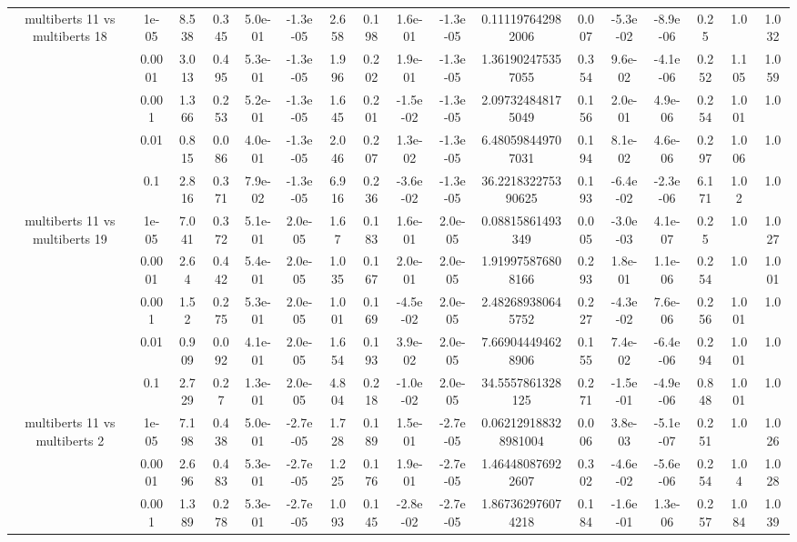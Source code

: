 \begin{tabular}{|c|c|c|c|c|c|c|c|c|c|c|c|c|c|c|c|c|}
\hline
\multirow{5}{*}{multiberts 11 vs multiberts 18} & 1e-05 & 8.538 & 0.345 & 5.0e-01 & -1.3e-05 & 2.658 & 0.198 & 1.6e-01 & -1.3e-05 & 0.111197642982006 & 0.007 & -5.3e-02 & -8.9e-06 & 0.25 & 1.0 & 1.032 \\
 & 0.0001 & 3.013 & 0.495 & 5.3e-01 & -1.3e-05 & 1.996 & 0.202 & 1.9e-01 & -1.3e-05 & 1.361902475357055 & 0.354 & 9.6e-02 & -4.1e-06 & 0.252 & 1.105 & 1.059 \\
 & 0.001 & 1.366 & 0.253 & 5.2e-01 & -1.3e-05 & 1.645 & 0.201 & -1.5e-02 & -1.3e-05 & 2.097324848175049 & 0.156 & 2.0e-01 & 4.9e-06 & 0.254 & 1.001 & 1.0 \\
 & 0.01 & 0.815 & 0.086 & 4.0e-01 & -1.3e-05 & 2.046 & 0.207 & 1.3e-02 & -1.3e-05 & 6.480598449707031 & 0.194 & 8.1e-02 & 4.6e-06 & 0.297 & 1.006 & 1.0 \\
 & 0.1 & 2.816 & 0.371 & 7.9e-02 & -1.3e-05 & 6.916 & 0.236 & -3.6e-02 & -1.3e-05 & 36.221832275390625 & 0.193 & -6.4e-02 & -2.3e-06 & 6.171 & 1.02 & 1.0 \\
\hline
\multirow{5}{*}{multiberts 11 vs multiberts 19} & 1e-05 & 7.041 & 0.372 & 5.1e-01 & 2.0e-05 & 1.67 & 0.183 & 1.6e-01 & 2.0e-05 & 0.08815861493349 & 0.005 & -3.0e-03 & 4.1e-07 & 0.25 & 1.0 & 1.027 \\
 & 0.0001 & 2.64 & 0.442 & 5.4e-01 & 2.0e-05 & 1.035 & 0.167 & 2.0e-01 & 2.0e-05 & 1.919975876808166 & 0.293 & 1.8e-01 & 1.1e-06 & 0.254 & 1.0 & 1.001 \\
 & 0.001 & 1.52 & 0.275 & 5.3e-01 & 2.0e-05 & 1.001 & 0.169 & -4.5e-02 & 2.0e-05 & 2.482689380645752 & 0.227 & -4.3e-02 & 7.6e-06 & 0.256 & 1.001 & 1.0 \\
 & 0.01 & 0.909 & 0.092 & 4.1e-01 & 2.0e-05 & 1.654 & 0.193 & 3.9e-02 & 2.0e-05 & 7.669044494628906 & 0.155 & 7.4e-02 & -6.4e-06 & 0.294 & 1.001 & 1.0 \\
 & 0.1 & 2.729 & 0.27 & 1.3e-01 & 2.0e-05 & 4.804 & 0.218 & -1.0e-02 & 2.0e-05 & 34.5557861328125 & 0.271 & -1.5e-01 & -4.9e-06 & 0.848 & 1.001 & 1.0 \\
\hline
\multirow{5}{*}{multiberts 11 vs multiberts 2} & 1e-05 & 7.198 & 0.438 & 5.0e-01 & -2.7e-05 & 1.728 & 0.189 & 1.5e-01 & -2.7e-05 & 0.062129188328981004 & 0.006 & 3.8e-03 & -5.1e-07 & 0.251 & 1.0 & 1.026 \\
 & 0.0001 & 2.696 & 0.483 & 5.3e-01 & -2.7e-05 & 1.225 & 0.176 & 1.9e-01 & -2.7e-05 & 1.464480876922607 & 0.302 & -4.6e-02 & -5.6e-06 & 0.254 & 1.04 & 1.028 \\
 & 0.001 & 1.389 & 0.278 & 5.3e-01 & -2.7e-05 & 1.093 & 0.145 & -2.8e-02 & -2.7e-05 & 1.867362976074218 & 0.184 & -1.6e-01 & 1.3e-06 & 0.257 & 1.084 & 1.039 \\

\end{tabular}
